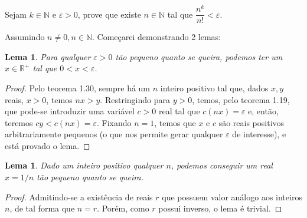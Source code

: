\documentclass{IMTexam}
\newtheorem{lemma}[theorem]{Lema}
\begin{document}
\begin{questions}
		
		 Sejam $ k \in \mathbb{N} $ e $ \varepsilon > 0 $, prove que existe $  n \in \mathbb{N} $ tal que $ \dfrac{n^{k}}{n!} < \varepsilon $.
		
		\begin{solution}
			Assumindo $ n\neq 0, n\in\mathbb{N} $. Começarei demonstrando 2 lemas:
			
			\begin{lemma}\label{lemma:lem4}
				Para qualquer $ \varepsilon > 0 $ tão pequeno quanto se queira, podemos ter um $ x\in\mathbb{R}^{+} $ tal que $ 0<x < \varepsilon $.
			\end{lemma}
			
			\begin{proof}
				Pelo teorema 1.30, sempre há um $ n $ inteiro positivo tal que, dados $ x,y $ reais, $ x>0 $, temos $ nx>y $. Restringindo para $ y>0 $, temos, pelo teorema 1.19, que pode-se introduzir uma variável $ c>0 $ real tal que $ c(nx)=\varepsilon $ e, então, teremos $ cy<c(nx)=\varepsilon $. Fixando $ n=1 $, temos que $ x $ e $ c $ são reais positivos arbitrariamente pequenos (o que nos permite gerar qualquer $ \varepsilon $ de interesse), e está provado o lema.
			\end{proof}
		
			\begin{lemma}
				Dado um inteiro positivo qualquer $ n $, podemos conseguir um real $ x=1/n $ tão pequeno quanto se queira.
			\end{lemma}
		
			\begin{proof}\label{lemma:lem6}
				Admitindo-se a existência de reais $ r $ que possuem valor análogo aos inteiros $ n $, de tal forma que $ n=r $. Porém, como $ r $ possui inverso, o lema é trivial.
			\end{proof}
		

\end{solution}
\end{questions}
\end{document}
